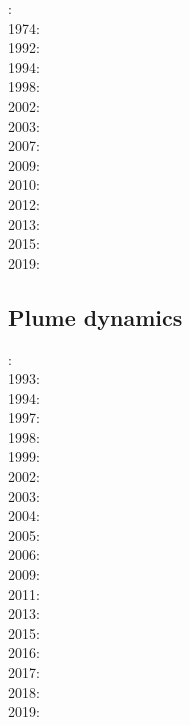 {\scriptsize
{}: \cite{mcse73}\\
1974: \cite{sosl74}\\
1992: \cite{zieg92a}\\
1994: \cite{guto94}\\
1998: \cite{zhgm98}\\
2002: \cite{stoc02}\\
2003: \cite{evan03}\cite{reta03}\\
2007: \cite{zhzl07}\\
2009: \cite{lizh09}\cite{vasv09}\\
2010: \cite{stto10}\\
2012: \cite{huss12}\cite{gutz12}\cite{qumm12}\cite{holr12}\\
2013: \cite{mosq13}\cite{cost13}\\
2015: \cite{yoha15}\\
2019: \cite{tewg19}
}

\subsection{Plume dynamics}

{\scriptsize
{}: \cite{kell91}\\
1993: \cite{keki93}\\
1994: \cite{nasf94}\cite{fari94}\cite{leka94b}\cite{hayu94}\\
1997: \cite{vank97}\cite{keki97}\\
1998: \cite{thta98}\cite{stoc98}\\
1999: \cite{lays99}\\
2002: \cite{falt02}\cite{dagl02}\cite{nitg02}\cite{tagh02}\\
2003: \cite{safa03}\\
2004: \cite{goch04}\cite{scmo04}\\
2005: \cite{tagu05}\\
2006: \cite{isst06}\cite{liva06a}\cite{liva06b}\cite{zhon06}\cite{mita06}\cite{nokm06}\cite{qufo06}
      \cite{keso06}\\
2009: \cite{vavl09}\cite{bogj09}\cite{faho09}\\
2011: \cite{toyu11}\cite{talz11}\cite{burk11}\cite{memm11}\cite{dalt11}\cite{tree11}\\
2013: \cite{dagm13}\cite{madd13}\cite{ande13}\\
2015: \cite{daso15}\cite{hafg15}\\
2016: \cite{kili16}\\
2017: \cite{zhli17}\\
2018: \cite{dacc18}\cite{trev18}\\
2019: \cite{argc19}
}

